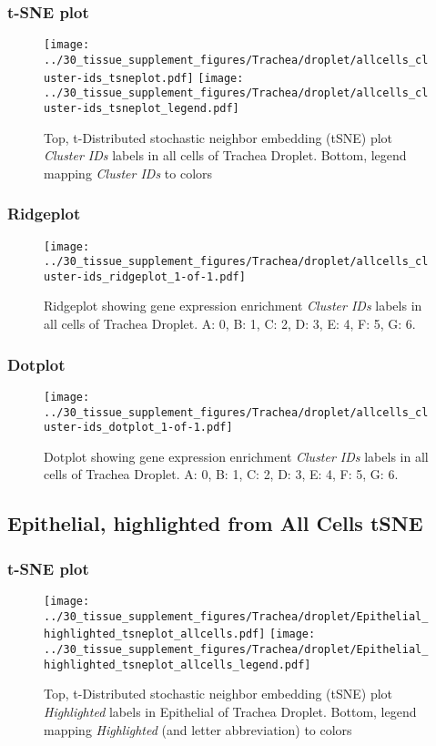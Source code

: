 \clearpage
\subsubsection{t-SNE plot}
\begin{figure}[h]
\centering
\texttt{[image: ../30\_tissue\_supplement\_figures/Trachea/droplet/allcells\_cluster-ids\_tsneplot.pdf]}
\texttt{[image: ../30\_tissue\_supplement\_figures/Trachea/droplet/allcells\_cluster-ids\_tsneplot\_legend.pdf]}
\caption{Top, t-Distributed stochastic neighbor embedding (tSNE) plot  \emph{Cluster IDs} labels in all cells of Trachea Droplet. Bottom, legend mapping \emph{Cluster IDs} to colors}
\end{figure}


\clearpage

\subsubsection{Ridgeplot}
\begin{figure}[h]
\centering
\texttt{[image: ../30\_tissue\_supplement\_figures/Trachea/droplet/allcells\_cluster-ids\_ridgeplot\_1-of-1.pdf]}

\caption{ Ridgeplot  showing gene expression enrichment \emph{Cluster IDs} labels in all cells of Trachea Droplet. A: 0, B: 1, C: 2, D: 3, E: 4, F: 5, G: 6.}
\end{figure}


\clearpage

\subsubsection{Dotplot}
\begin{figure}[h]
\centering
\texttt{[image: ../30\_tissue\_supplement\_figures/Trachea/droplet/allcells\_cluster-ids\_dotplot\_1-of-1.pdf]}

\caption{ Dotplot  showing gene expression enrichment \emph{Cluster IDs} labels in all cells of Trachea Droplet. A: 0, B: 1, C: 2, D: 3, E: 4, F: 5, G: 6.}
\end{figure}


\clearpage
\subsection{Epithelial, highlighted from All Cells tSNE}
\subsubsection{t-SNE plot}
\begin{figure}[h]
\centering
\texttt{[image: ../30\_tissue\_supplement\_figures/Trachea/droplet/Epithelial\_highlighted\_tsneplot\_allcells.pdf]}
\texttt{[image: ../30\_tissue\_supplement\_figures/Trachea/droplet/Epithelial\_highlighted\_tsneplot\_allcells\_legend.pdf]}
\caption{Top, t-Distributed stochastic neighbor embedding (tSNE) plot  \emph{Highlighted} labels in Epithelial of Trachea Droplet. Bottom, legend mapping \emph{Highlighted} (and letter abbreviation) to colors}
\end{figure}


